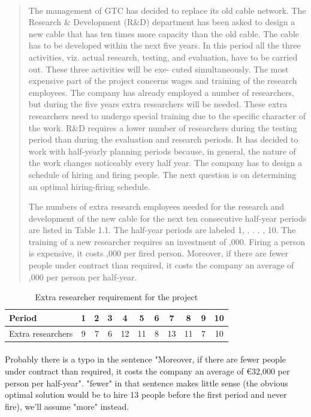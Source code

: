 \paragraph{}
\begin{quote}
The management of GTC has decided to replace its old cable network. The Research \& Development (R\&D) department has been asked to design a new cable that has ten times more capacity than the old cable. The cable has to be developed within the next five years. In this period all the three activities, viz. actual research, testing, and evaluation, have to be carried out. These three activities will be exe- cuted simultaneously. The most expensive part of the project concerns wages and training of the research employees. The company has already employed a number of researchers, but during the five years extra researchers will be needed. These extra researchers need to undergo special training due to the specific character of the work. R\&D requires a lower number of researchers during the testing period than during the evaluation and research periods. It has decided to work with half-yearly planning periods because, in general, the nature of the work changes noticeably every half year. The company has to design a schedule of hiring and firing people. The next question is on determining an optimal hiring-firing schedule.

The numbers of extra research employees needed for the research and development of the new cable for the next ten consecutive half-year periods are listed in Table 1.1. The half-year periods are labeled 1, . . . , 10. The training of a new researcher requires an investment of ,000. Firing a person is expensive, it costs ,000 per fired person. Moreover, if there are fewer people under contract than required, it costs the company an average of ,000 per person per half-year.
\end{quote}

\begin{table}[H]
\centering
\begin{tabular}{lcccccccccc}
\hline
Period & 1 & 2 & 3 & 4 & 5 & 6 & 7 & 8 & 9 & 10 \\ \hline
Extra researchers & 9 & 7 & 6 & 12 & 11 & 8 & 13 & 11 & 7 & 10 \\ \hline
\end{tabular}
\caption{Extra researcher requirement for the project}
\label{extra-researchers}
\end{table}

\paragraph{}
Probably there is a typo in the sentence "Moreover, if there are fewer people under contract than required, it costs the company an average of €32,000 per person per half-year". "fewer" in that sentence makes little sense (the obvious optimal solution would be to hire 13 people before the first period and never fire), we'll assume "more" instead.

